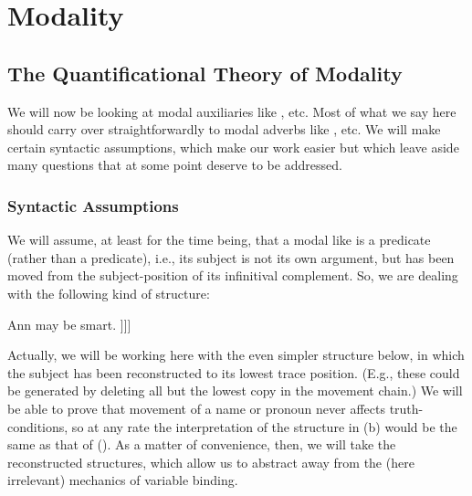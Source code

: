 \chapter{Modality}\label{cha:modality} %


\minitoc

\section{The Quantificational Theory of Modality} \label{sec:quant-theory-modal}

We will now be looking at modal auxiliaries like , etc. Most of what we say here should carry over straightforwardly to
modal adverbs like , etc. We will make
certain syntactic assumptions, which make our work easier but which leave aside
many questions that at some point deserve to be addressed.

\clearpage
\subsection{Syntactic Assumptions} \label{sec:synt-assumpt-1}

We will assume, at least for the time being, that a modal like 
is a  predicate (rather than a  predicate), i.e.,
its subject is not its own argument, but has been moved from the
subject-position of its infinitival complement. So, we are
dealing with the following kind of structure:

\pex
\a Ann may be smart. 
\a\null [ Ann [ $\lambda_1$ [ may [ t$_1$ be smart ]]]]
\xe

Actually, we will be working here with the even simpler structure below, in
which the subject has been reconstructed to its lowest trace position. (E.g.,
these could be generated by deleting all but the lowest copy in the movement
chain.) We will
be able to prove that movement of a name or pronoun never affects
truth-conditions, so at any rate the interpretation of the structure in (\lastx b)
would be the same as that of (\nextx). As a matter of convenience, then, we will
take the reconstructed structures, which allow us to abstract away from the
(here irrelevant) mechanics of variable binding.

